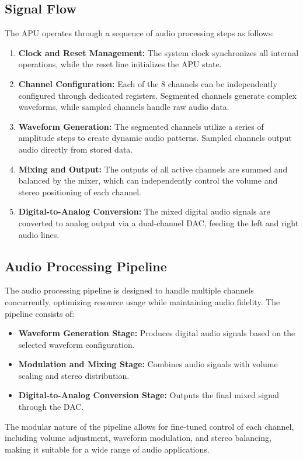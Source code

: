 \subsection{Signal Flow}
The APU operates through a sequence of audio processing steps as follows:
\begin{enumerate}
    \item \textbf{Clock and Reset Management:} The system clock synchronizes all internal operations, while the reset line initializes the APU state.
    \item \textbf{Channel Configuration:} Each of the 8 channels can be independently configured through dedicated registers. Segmented channels generate complex waveforms, while sampled channels handle raw audio data.
    \item \textbf{Waveform Generation:} The segmented channels utilize a series of amplitude steps to create dynamic audio patterns. Sampled channels output audio directly from stored data.
    \item \textbf{Mixing and Output:} The outputs of all active channels are summed and balanced by the mixer, which can independently control the volume and stereo positioning of each channel.
    \item \textbf{Digital-to-Analog Conversion:} The mixed digital audio signals are converted to analog output via a dual-channel DAC, feeding the left and right audio lines.
\end{enumerate}

\subsection{Audio Processing Pipeline}
The audio processing pipeline is designed to handle multiple channels concurrently, optimizing resource usage while maintaining audio fidelity. The pipeline consists of:
\begin{itemize}
    \item \textbf{Waveform Generation Stage:} Produces digital audio signals based on the selected waveform configuration.
    \item \textbf{Modulation and Mixing Stage:} Combines audio signals with volume scaling and stereo distribution.
    \item \textbf{Digital-to-Analog Conversion Stage:} Outputs the final mixed signal through the DAC.
\end{itemize}

The modular nature of the pipeline allows for fine-tuned control of each channel, including volume adjustment, waveform modulation, and stereo balancing, making it suitable for a wide range of audio applications.